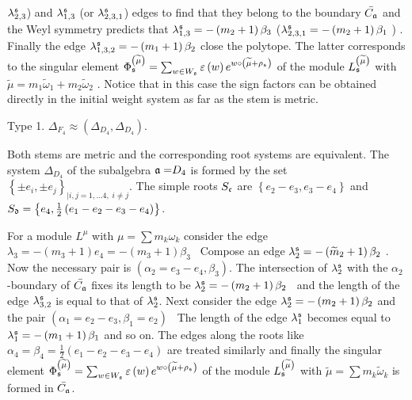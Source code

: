 \documentclass[12pt]{article}
\begin{document}
$\lambda _{2,3}^{\frak{s}} $) and $\lambda _{1,3}^{\frak{s}}$ (or
$\lambda _{2,3,1}^{\frak{s}}$) edges to find that they belong to
the boundary $\bar{C_{\frak{a}}}$ and the Weyl symmetry predicts
that $\lambda _{1,3}^{\frak{s}}=-\left( m_{2}+1\right)
\beta _{3}$ ($\lambda _{2,3,1}^{\frak{s}}=-\left( m_{2}+1\right) \beta _{1}$%
) . Finally the edge $\lambda _{1,3,2}^{\frak{s}}=-\left(
m_{1}+1\right) \beta _{2}$ close the polytope. The latter
corresponds to the singular
element $\Phi _{\frak{s}}^{\left( \widetilde{\mu }\right) }=\sum_{w\in W_{%
\frak{s}}}\varepsilon \left( w\right) e^{w\circ \left(
\widetilde{\mu }+\rho
_{\frak{s}}\right) }$ of the module $L_{\frak{s}}^{\left( \widetilde{\mu }%
\right) }$ with $\widetilde{\mu }=m_{1}\widetilde{\omega }_{1}+m_{2}%
\widetilde{\omega }_{2}$ . Notice that in this case the sign
factors can be obtained directly in the initial weight system as
far as the stem is metric.

Type 1. $\Delta _{F_{4}}\approx (\Delta _{D_{4}},\Delta
_{D_{4}}).$

Both stems are metric and the corresponding root systems are
equivalent. The system $\Delta _{D_{4}}$ of the subalgebra
$\frak{a=}D_{4}$ is formed by the set $\left\{ \pm e_{i},\pm
e_{j}\right\} _{|i,j=1,\ldots 4,\; i\neq j}.$ The simple roots
$S_{\frak{c}}$ are $\left\{ e_{2}-e_{3},e_{3}-e_{4}\right\} $ and
$S_{\frak{d}}=\left\{ e_{4},\frac{1}{2}\left(
e_{1}-e_{2}-e_{3}-e_{4}\right) \right\} $.

For a module $L^{\mu }$ with $\mu =\sum m_{k}\omega _{k}$ consider the edge $%
\lambda _{3}=-\left( m_{3}+1\right) e_{4}=-\left( m_{3}+1\right)
\beta _{3}$
\ Compose an edge $\lambda _{2}^{\frak{s}}=-\left( \widetilde{m}%
_{2}+1\right) \beta _{2}$ . Now the necessary pair is $\left(
\alpha
_{2}=e_{3}-e_{4},\beta _{3}\right) $. The intersection of $\lambda _{2}^{%
\frak{s}}$ with the $\alpha _{2}$ -boundary of
$\bar{C_{\frak{a}}}$ fixes
its length to be $\lambda _{2}^{\frak{s}}=-\left( m_{2}+1\right) \beta _{2}$%
\ and the length of the edge $\lambda _{3,2}^{\frak{s}}$ is equal
to that of
$\lambda _{2}^{\frak{s}}$. Next consider the edge $\lambda _{2}^{\frak{s}%
}=-\left( m_{2}+1\right) \beta _{2}$ and the pair $\left( \alpha
_{1}=e_{2}-e_{3},\beta _{1}=e_{2}\right) $ \ The length of the
edge $\lambda _{1}^{\frak{s}}$ becomes equal to $\lambda
_{1}^{\frak{s}}=-\left( m_{1}+1\right) \beta _{1}$ and so on. The
edges along the roots like $\alpha _{4}=\beta
_{4}=\frac{1}{2}\left( e_{1}-e_{2}-e_{3}-e_{4}\right) $ are
treated similarly and finally the singular element $\Phi
_{\frak{s}}^{\left( \widetilde{\mu }\right) }=\sum_{w\in
W_{\frak{s}}}\varepsilon \left( w\right) e^{w\circ \left(
\widetilde{\mu }+\rho _{\frak{s}}\right) }$ of the module
$L_{\frak{s}}^{\left( \widetilde{\mu }\right) }$ with
$\widetilde{\mu }=\sum m_{k}\widetilde{\omega }_{k}$ is formed in
$\bar{C_{\frak{a}}}$.
\end{document}
